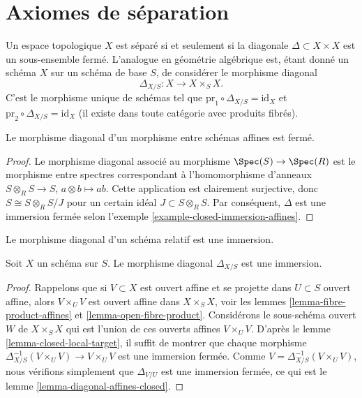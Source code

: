 \section{Axiomes de séparation}
\label{section-separation-axioms}

\noindent
Un espace topologique $X$ est séparé si et seulement si la
diagonale $\Delta \subset X \times X$ est un sous-ensemble fermé.
L'analogue en géométrie algébrique est, étant donné un schéma $X$ sur
un schéma de base $S$, de considérer le
morphisme diagonal
$$
\Delta_{X/S} : X \longrightarrow X \times_S X.
$$
C'est le morphisme unique de schémas tel que
$\text{pr}_1 \circ \Delta_{X/S} = \text{id}_X$ et
$\text{pr}_2 \circ \Delta_{X/S} = \text{id}_X$ (il existe dans toute
catégorie avec produits fibrés).

\begin{lemma}
\label{lemma-diagonal-affines-closed}
Le morphisme diagonal d'un morphisme entre schémas affines est fermé.
\end{lemma}

\begin{proof}
Le morphisme diagonal associé au morphisme $\Spec(S) \to
\Spec(R)$ est le morphisme entre spectres correspondant
à l'homomorphisme d'anneaux
$S \otimes_R S \to S$, $a \otimes b \mapsto ab$. Cette
application est clairement surjective, donc $S \cong S \otimes_R S/J$
pour un certain idéal $J \subset S \otimes_R S$. Par
conséquent, $\Delta$ est une immersion fermée
selon l'exemple \ref{example-closed-immersion-affines}.
\end{proof}

\begin{lemma}
\label{lemma-diagonal-immersion}
\begin{slogan}
Le morphisme diagonal d'un schéma relatif est une immersion.
\end{slogan}
Soit $X$ un schéma sur $S$. Le
morphisme diagonal $\Delta_{X/S}$ est une immersion.
\end{lemma}

\begin{proof}
Rappelons que si $V \subset X$ est ouvert affine et se projette
dans $U \subset S$ ouvert affine, alors $V \times_U V$ est ouvert
affine dans $X \times_S X$, voir les lemmes \ref{lemma-fibre-product-affines}
et \ref{lemma-open-fibre-product}.
Considérons le sous-schéma ouvert $W$ de $X \times_S X$
qui est l'union de ces ouverts affines $V \times_U V$.
D'après le lemme \ref{lemma-closed-local-target}, il suffit
de montrer que chaque morphisme
$\Delta_{X/S}^{-1}(V \times_U V) \to V \times_U V$ est
une immersion fermée. Comme $V = \Delta_{X/S}^{-1}(V \times_U V)$,
nous vérifions simplement que $\Delta_{V/U}$ est une immersion
fermée, ce qui est le lemme \ref{lemma-diagonal-affines-closed}.
\end{proof}

